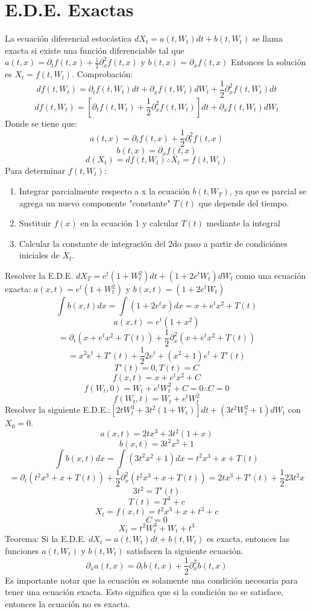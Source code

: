 \documentclass[11pt,fleqn]{book} %
\numberwithin{equation}{section} %
\numberwithin{figure}{section} %
\numberwithin{table}{section} %
\begin{document}
\section{E.D.E. Exactas}
La ecuación diferencial estocástica $dX_t=a(t,W_t)dt+b(t,W_t)$ se llama exacta si existe una función diferenciable tal que $a(t,x)=\partial_t f(t,x)+\frac{1}{2}\partial^2_xf(t,x)$ y $b(t,x)=\partial_xf(t,x)$ Entonces la solución es $X_t=f(t,W_t)$.
Comprobación: 
$$ df(t,W_t)=\partial_t f(t,W_t)dt+\partial_xf(t,W_t)dW_t+\frac{1}{2}\partial^2_xf(t,W_t)dt $$
$$ df(t,W_t)=[\partial_t f(t,W_t)+\frac{1}{2}\partial^2_xf(t,W_t)]dt+\partial_xf(t,W_t)dW_t $$
Donde se tiene que:
$$a(t,x)=\partial_t f(t,x)+\frac{1}{2}\partial^2_tf(t,x)$$
$$b(t,x)=\partial_xf(t,x)$$
$$d(X_t)=df(t,W_t) \therefore X_t=f(t,W_t)$$
Para determinar $f(t,W_t)$:
\begin{enumerate}
    \item Integrar parcialmente respecto a x la ecuación $b(t,W_T)$, ya que es parcial se agrega un nuevo componente "constante" $T(t)$ que depende del tiempo. 
    \item Sustituir $f(x)$ en la ecuación 1 y calcular $T(t)$ mediante la integral
    \item Calcular la constante de integración del 2do paso a partir de condiciónes iniciales de $X_t$.
\end{enumerate}
Resolver la E.D.E. $dX_T= e^t(1+W_t^2)dt+(1+2e^tW_t)dW_t$ como una ecuación exacta:
$a(x,t)=e^t(1+W_t^2)$ y $b(x,t)=(1+2e^tW_t)$
$$\int b(x,t)dx=\int(1+2e^tx)dx=x+e^tx^2+T(t)$$
$$a(x,t)=e^t(1+x^2)$$
$$=\partial_t(x+e^tx^2+T(t)) +\frac{1}{2}\partial^2_x(x+e^tx^2+T(t))$$
$$=x^2e^t+T'(t)+\frac{1}{2}2e^t+(x^2+1)e^t+T'(t)$$
$$T'(t)=0, T(t)=C$$
$$f(x,t)=x+e^tx^2+C$$
$$f(W_t,0)=W_t+e^tW_t^2+C=0 \therefore C=0$$
$$f(W_t,t)=W_t+e^tW_t^2$$
Resolver la siguiente E.D.E.:$[2tW_t^3+3t^2(1+W_t)]dt+(3t^2W_t^2+1)dW_t$ con $X_0=0$.
$$a(x,t)=2tx^3+3t^2(1+x)$$
$$b(x,t)=3t^2x^2+1$$
$$\int b(x,t)dx=\int(3t^2x^2+1)dx=t^2x^3+x+T(t)$$
$$=\partial_t (t^2x^3+x+T(t)) +\frac{1}{2}\partial^2_x(t^2x^3+x+T(t))=2tx^3+T'(t)+\frac{1}{2}23t^2x$$
$$3t^2=T'(t)$$
$$T(t)=T^3+c$$
$$X_t=f(x,t)=t^2x^3+x+t^3+c$$
$$C=0$$
$$X_t=t^2W_t^3+W_t+t^3$$
Teorema: Si la E.D.E. $dX_t=a(t,W_t)dt+b(t,W_t)$ es exacta, entonces las funciones $a(t,W_t)$ y $b(t,W_t)$ satisfacen la siguiente ecuación.
$$\partial_x a(t,x)=\partial_t b(t,x)+\frac{1}{2}\partial^2_x b(t,x)$$
Es importante notar que la ecuación es solamente una condición necesaria para tener una ecuación exacta. Esto significa que si la condición no se satisface, entonces la ecuación no es exacta. 
\end{document}
